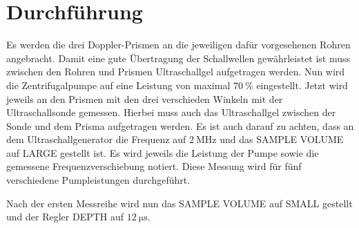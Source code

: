 
\section{Durchführung}
\label{sec:Durchführung}
Es werden die drei Doppler-Prismen an die jeweiligen dafür vorgesehenen Rohren angebracht. Damit eine gute Übertragung der Schallwellen gewährleistet ist muss zwischen den Rohren und Prismen Ultraschallgel aufgetragen werden.  Nun wird die Zentrifugalpumpe auf eine Leistung von maximal $\SI{70}{\percent}$ eingestellt. Jetzt wird jeweils an den Prismen mit den drei verschieden Winkeln mit der Ultraschallsonde gemessen. Hierbei muss auch das Ultraschallgel zwischen der Sonde und dem Prisma aufgetragen werden. Es ist auch darauf zu achten, dass an dem Ultraschallgenerator die Frequenz auf $\SI{2}{\mega\hertz}$ und das SAMPLE VOLUME auf LARGE gestellt ist. Es wird jeweils die Leistung der Pumpe sowie die gemessene Frequenzverschiebung notiert. Diese Messung wird für fünf verschiedene Pumpleistungen durchgeführt.

Nach der ersten Messreihe wird nun das SAMPLE VOLUME auf SMALL gestellt und der Regler DEPTH auf $\SI{12}{\micro\second}$.